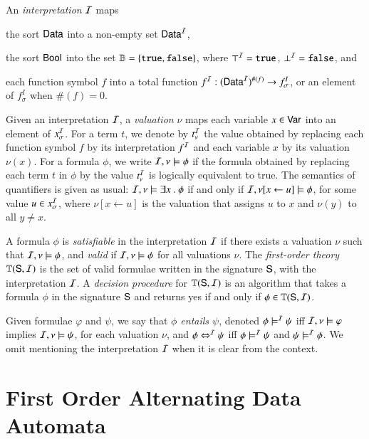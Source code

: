 \documentclass{llncs}
\begin{document}
An \emph{interpretation} $\mathcal{I}$ maps\begin{inparaenum}[(1)]
\item the sort $\mathsf{Data}$ into a non-empty set $\mathsf{Data}^{\mathcal{I}}$, 
%
\item the sort $\mathsf{Bool}$ into the set $\mathbb{B} = \{ \mathtt{true},\mathtt{false} \}$, where
  $\top^{\mathcal{I}} = \mathtt{true}$, $\bot^{\mathcal{I}} = \mathtt{false}$, and
%
\item each function symbol $f$ into a total function $f^{\mathcal{I}} :
  (\mathsf{Data}^{\mathcal{I}})^{\#(f)} \rightarrow f_\sigma^I$, or an element of
  $f_\sigma^I$ when $\#(f)=0$.
\end{inparaenum}
Given an interpretation $\mathcal{I}$, a \emph{valuation} $\nu$ maps each
variable $x \in \mathsf{Var}$ into an element of $x_\sigma^{\mathcal{I}}$. For a term
$t$, we denote by $t^{\mathcal{I}}_\nu$ the value obtained by replacing each
function symbol $f$ by its interpretation $f^{\mathcal{I}}$ and each variable $x$
by its valuation $\nu(x)$. For a formula $\phi$, we write $\mathcal{I},\nu
\models \phi$ if the formula obtained by replacing each term $t$ in
$\phi$ by the value $t^{\mathcal{I}}_\nu$ is logically equivalent to true.  The
semantics of quantifiers is given as usual: $\mathcal{I},\nu \models \exists x
~.~ \phi$ if and only if $\mathcal{I},\nu[x \leftarrow u] \models \phi$, for
some value $u \in x_\sigma^{\mathcal{I}}$, where $\nu[x \leftarrow u]$ is the
valuation that assigns $u$ to $x$ and $\nu(y)$ to all $y \neq x$.

A formula $\phi$ is \emph{satisfiable} in the interpretation $\mathcal{I}$ if
there exists a valuation $\nu$ such that $\mathcal{I},\nu \models \phi$, and
\emph{valid} if $\mathcal{I},\nu \models \phi$ for all valuations $\nu$.  The
\emph{first-order theory} $\mathbb{T}(\mathsf{S},\mathcal{I})$ is the set of valid
formulae written in the signature $\mathsf{S}$, with the interpretation
$\mathcal{I}$. A \emph{decision procedure} for $\mathbb{T}(\mathsf{S},\mathcal{I})$ is an
algorithm that takes a formula $\phi$ in the signature $\mathsf{S}$ and
returns yes if and only if $\phi \in \mathbb{T}(\mathsf{S},\mathcal{I})$.

Given formulae $\varphi$ and $\psi$, we say that \emph{$\phi$ entails
  $\psi$}, denoted $\phi \models^{\mathcal{I}} \psi$ iff $\mathcal{I},\nu \models \varphi$
implies $\mathcal{I},\nu \models \psi$, for each valuation $\nu$, and $\phi
\Leftrightarrow^{\mathcal{I}} \psi$ iff $\phi \models^{\mathcal{I}} \psi$ and $\psi \models^{\mathcal{I}} \phi$.
We omit mentioning the interpretation $\mathcal{I}$ when it is clear from the
context.

\section{First Order Alternating Data Automata}
\end{document}
